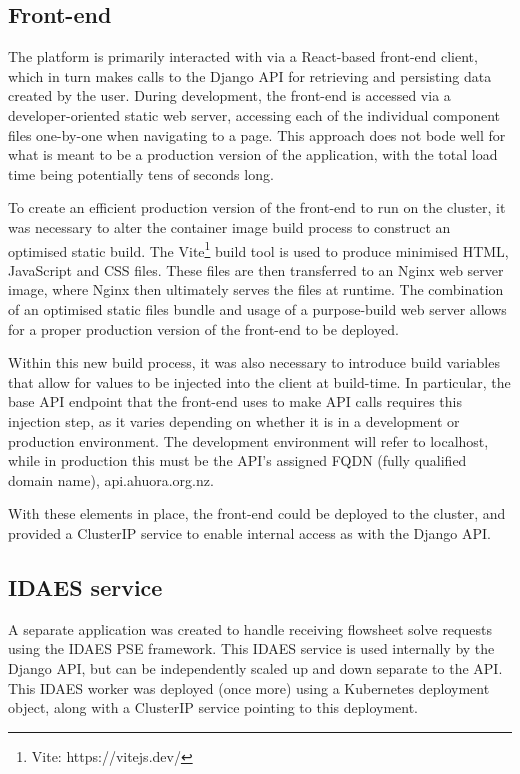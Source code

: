 

\subsection{Front-end}

The platform is primarily interacted with via a React-based front-end client, which in turn makes calls to the Django API for retrieving and persisting data created by the user. During development, the front-end is accessed via a developer-oriented static web server, accessing each of the individual component files one-by-one when navigating to a page. This approach does not bode well for what is meant to be a production version of the application, with the total load time being potentially tens of seconds long.

To create an efficient production version of the front-end to run on the cluster, it was necessary to alter the container image build process to construct an optimised static build. The Vite\footnote{Vite: https://vitejs.dev/} build tool is used to produce minimised HTML, JavaScript and CSS files. These files are then transferred to an Nginx web server image, where Nginx then ultimately serves the files at runtime. The combination of an optimised static files bundle and usage of a purpose-build web server allows for a proper production version of the front-end to be deployed.

Within this new build process, it was also necessary to introduce build variables that allow for values to be injected into the client at build-time. In particular, the base API endpoint that the front-end uses to make API calls requires this injection step, as it varies depending on whether it is in a development or production environment. The development environment will refer to localhost, while in production this must be the API's assigned FQDN (fully qualified domain name), api.ahuora.org.nz.

With these elements in place, the front-end could be deployed to the cluster, and provided a ClusterIP service to enable internal access as with the Django API.

\subsection{IDAES service}

A separate application was created to handle receiving flowsheet solve requests using the IDAES PSE framework. This IDAES service is used internally by the Django API, but can be independently scaled up and down separate to the API. This IDAES worker was deployed (once more) using a Kubernetes deployment object, along with a ClusterIP service pointing to this deployment.

